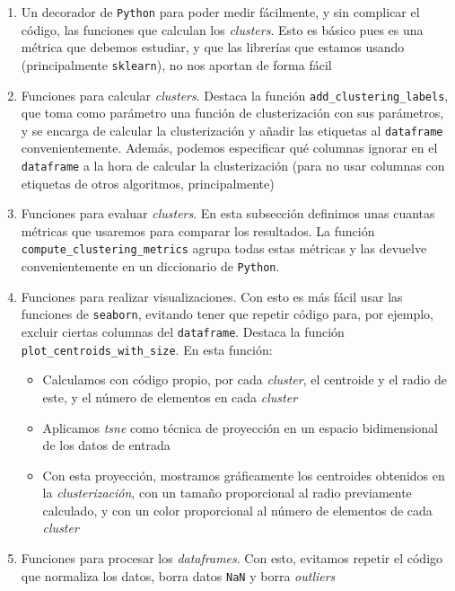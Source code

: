 \documentclass[11pt]{article}
\begin{document}
\begin{enumerate}
    \item Un decorador de \lstinline{Python} para poder medir fácilmente, y sin complicar el código, las funciones que calculan los \emph{clusters}. Esto es básico pues es una métrica que debemos estudiar, y que las librerías que estamos usando (principalmente \lstinline{sklearn}), no nos aportan de forma fácil
    \item Funciones para calcular \emph{clusters}. Destaca la función \lstinline{add_clustering_labels}, que toma como parámetro una función de clusterización con sus parámetros, y se encarga de calcular la clusterización y añadir las etiquetas al \lstinline{dataframe} convenientemente. Además, podemos especificar qué columnas ignorar en el \lstinline{dataframe} a la hora de calcular la clusterización (para no usar columnas con etiquetas de otros algoritmos, principalmente)
    \item Funciones para evaluar \emph{clusters}. En esta subsección definimos unas cuantas métricas que usaremos para comparar los resultados. La función \lstinline{compute_clustering_metrics} agrupa todas estas métricas y las devuelve convenientemente en un diccionario de \lstinline{Python}.
    \item Funciones para realizar visualizaciones. Con esto es más fácil usar las funciones de \lstinline{seaborn}, evitando tener que repetir código para, por ejemplo, excluir ciertas columnas del \lstinline{dataframe}. Destaca la función \lstinline{plot_centroids_with_size}. En esta función:
    \begin{itemize}
        \item Calculamos con código propio, por cada \emph{cluster}, el centroide y el radio de este, y el número de elementos en cada \emph{cluster}
        \item Aplicamos \emph{tsne} como técnica de proyección en un espacio bidimensional de los datos de entrada
        \item Con esta proyección, mostramos gráficamente los centroides obtenidos en la \emph{clusterización}, con un tamaño proporcional al radio previamente calculado, y con un color proporcional al número de elementos de cada \emph{cluster}
    \end{itemize}
    \item Funciones para procesar los \emph{dataframes}. Con esto, evitamos repetir el código que normaliza los datos, borra datos \lstinline{NaN} y borra \emph{outliers}
\end{enumerate}
\end{document}

